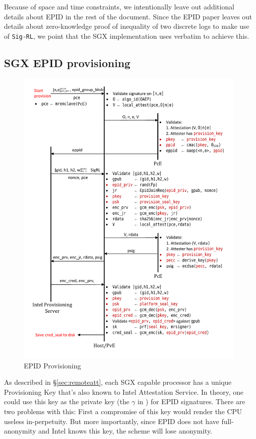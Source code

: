 \documentclass[letterpaper]{article}
\newcommand{\secref}[1]{\S\ref{#1}}
\begin{document}
  Because of space and time constraints, we intentionally leave out
  additional details about EPID in the rest of the document. Since the
  EPID paper leaves out details about zero-knowledge proof of
  inequality of two discrete logs to make use of \texttt{Sig-RL}, we
  point that the SGX implementation uses \cite[\S6]{ShoupVFE} verbatim
  to achieve this.

  \subsection{SGX EPID provisioning}
  \label{ssec:epidprov}
  \begin{figure}
  \centering
  \includegraphics[width=0.8\linewidth]{Diagrams/EpidProvisioning}
  \caption{EPID Provisioning}
  \label{fig:epidprov}
  \end{figure}

  As described in \secref{sec:remoteatt}, each SGX capable processor
  has a unique Provisioning Key that's also known to Intel Attestation
  Service. In theory, one could use this key as the private key (the
  $\gamma$ in \cite{epid}) for EPID signatures. There are two problems
  with this: First a compromise of this key would render the CPU
  useless in-perpetuity. But more importantly, since EPID does not
  have full-anonymity and Intel knows this key, the scheme will lose
  anonymity.
\end{document}
